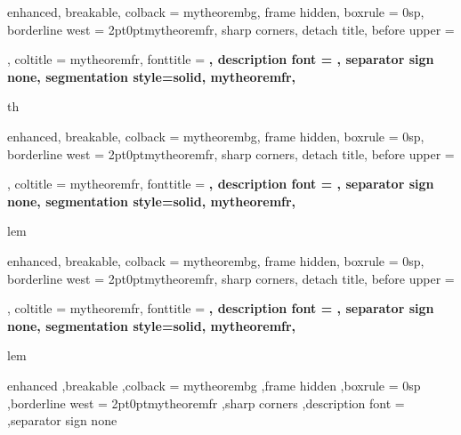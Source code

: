 {%
	enhanced,
	breakable,
	colback = mytheorembg,
	frame hidden,
	boxrule = 0sp,
	borderline west = {2pt}{0pt}{mytheoremfr},
	sharp corners,
	detach title,
	before upper = \tcbtitle\par\smallskip,
	coltitle = mytheoremfr,
	fonttitle = \bfseries\sffamily,
	description font = \mdseries,
	separator sign none,
	segmentation style={solid, mytheoremfr},
}
{th}


{%
	enhanced,
	breakable,
	colback = mytheorembg,
	frame hidden,
	boxrule = 0sp,
	borderline west = {2pt}{0pt}{mytheoremfr},
	sharp corners,
	detach title,
	before upper = \tcbtitle\par\smallskip,
	coltitle = mytheoremfr,
	fonttitle = \bfseries\sffamily,
	description font = \mdseries,
	separator sign none,
	segmentation style={solid, mytheoremfr},
}
{lem}

{%
	enhanced,
	breakable,
	colback = mytheorembg,
	frame hidden,
	boxrule = 0sp,
	borderline west = {2pt}{0pt}{mytheoremfr},
	sharp corners,
	detach title,
	before upper = \tcbtitle\par\smallskip,
	coltitle = mytheoremfr,
	fonttitle = \bfseries\sffamily,
	description font = \mdseries,
	separator sign none,
	segmentation style={solid, mytheoremfr},
}
{lem}


{%
	enhanced
	,breakable
	,colback = mytheorembg
	,frame hidden
	,boxrule = 0sp
	,borderline west = {2pt}{0pt}{mytheoremfr}
	,sharp corners
	,description font = \mdseries
	,separator sign none
}


